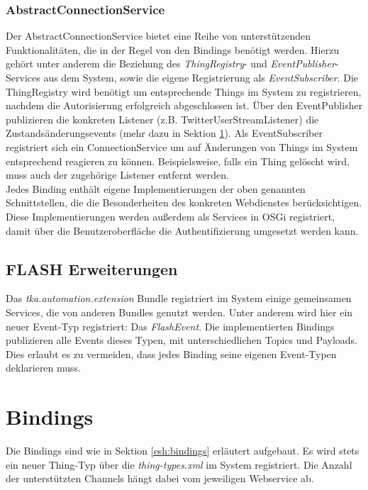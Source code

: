 \subsubsection{AbstractConnectionService}
Der AbstractConnectionService bietet eine Reihe von unterstützenden Funktionalitäten, die in der Regel von den Bindings benötigt werden. Hierzu gehört unter anderem die Beziehung des \textit{ThingRegistry}- und \textit{EventPublisher}-Services aus dem System, sowie die eigene Registrierung als \textit{EventSubscriber}. Die ThingRegistry wird benötigt um entsprechende Things im System zu registrieren, nachdem die Autorisierung erfolgreich abgeschlossen ist. Über den EventPublisher publizieren die konkreten Listener (z.B. TwitterUserStreamListener) die Zustandsänderungsevents (mehr dazu in Sektion \ref{sec:bindings_impl}). Als EventSubscriber registriert sich ein ConnectionService um auf Änderungen von Things im System entsprechend reagieren zu können. Beispielsweise, falls ein Thing gelöscht wird, muss auch der zugehörige Listener entfernt werden.\\



Jedes Binding enthält eigene Implementierungen der oben genannten Schnittstellen, die die Besonderheiten des konkreten Webdienstes berücksichtigen. Diese Implementierungen werden außerdem als Services in OSGi registriert, damit über die Benutzeroberfläche die Authentifizierung umgesetzt werden kann.


\subsection{FLASH Erweiterungen}
Das \textit{tka.automation.extension} Bundle registriert im System einige gemeinsamen Services, die von anderen Bundles genutzt werden. Unter anderem wird hier ein neuer Event-Typ registriert: Das \textit{FlashEvent}. Die implementierten Bindings publizieren alle Events dieses Typen, mit unterschiedlichen Topics und Payloads. Dies erlaubt es zu vermeiden, dass jedes Binding seine eigenen Event-Typen deklarieren muss. 


\section{Bindings}
\label{sec:bindings_impl}
Die Bindings sind wie in Sektion \ref{esh:bindings} erläutert aufgebaut. Es wird stets ein neuer Thing-Typ über die \textit{thing-types.xml} im System registriert. Die Anzahl der unterstützten Channels hängt dabei vom jeweiligen Webservice ab.

